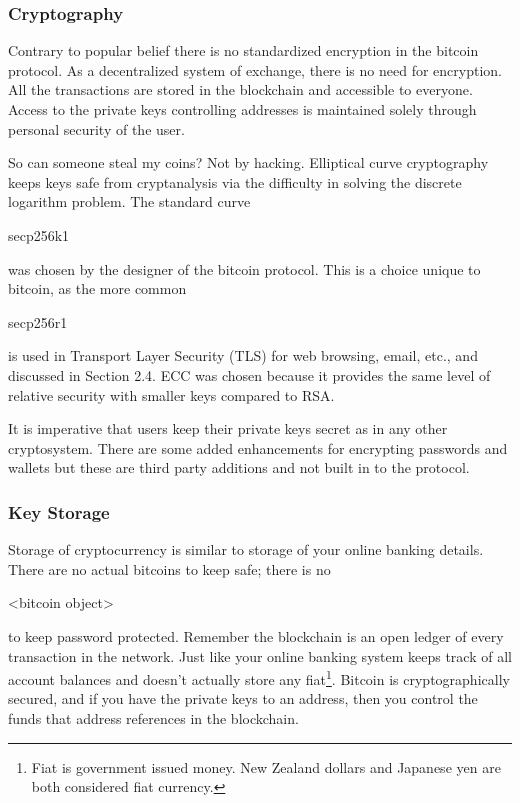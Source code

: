 \subsubsection*{Cryptography}\label{Se:bitcoinCryptography}
Contrary to popular belief there is no standardized encryption in the bitcoin protocol. As a decentralized system of exchange, there is no need for encryption. All the transactions are stored in the blockchain and accessible to everyone. Access to the private keys controlling addresses is maintained solely through personal security of the user. 

So can someone steal my coins? Not by hacking. Elliptical curve cryptography keeps keys safe from cryptanalysis via the difficulty in solving the discrete logarithm problem. The standard curve \begin{code}secp256k1\end{code} was chosen by the designer of the bitcoin protocol. This is a choice unique to bitcoin, as the more common \begin{code}secp256r1\end{code} is used in Transport Layer Security (TLS) for web browsing, email, etc., and discussed in Section 2.4. ECC was chosen because it provides the same level of relative security with smaller keys compared to RSA.

It is imperative that users keep their private keys secret as in any other cryptosystem. There are some added enhancements for encrypting passwords and wallets but these are third party additions and not built in to the protocol.

\subsubsection*{Key Storage}

Storage of cryptocurrency is similar to storage of your online banking details. There are no actual bitcoins to keep safe; there is no \begin{code}<bitcoin object>\end{code} to keep password protected. Remember the blockchain is an open ledger of every transaction in the network. Just like your online banking system keeps track of all account balances and doesn't actually store any fiat\footnote{Fiat is government issued money. New Zealand dollars and Japanese yen are both considered fiat currency.}. Bitcoin is cryptographically secured, and if you have the private keys to an address, then you control the funds that address references in the blockchain. 

